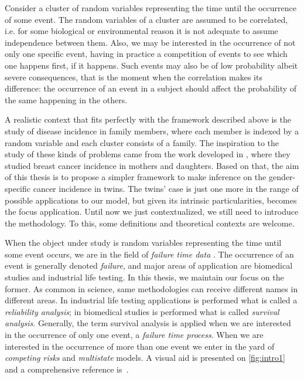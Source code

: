Consider a cluster of random variables representing the time until the
occurrence of some event. The random variables of a cluster are assumed
to be correlated, i.e. for some biological or environmental reason it is
not adequate to assume independence between them. Also, we may be
interested in the occurrence of not only one specific event, having in
practice a competition of events to see which one happens first, if it
happens. Such events may also be of low probability albeit severe
consequences, that is the moment when the correlation makes its
difference: the occurrence of an event in a subject should affect the
probability of the same happening in the others.

A realistic context that fits perfectly with the framework described
above is the study of disease incidence in family members, where each
member is indexed by a random variable and each cluster consists of a
family. The inspiration to the study of these kinds of problems came
from the work developed in , where they studied
breast cancer incidence in mothers and daughters. Based on that, the aim
of this thesis is to propose a simpler framework to make inference on
the gender-specific cancer incidence in twins. The twins' case is just
one more in the range of possible applications to our model, but given
its intrinsic particularities, becomes the focus application. Until now
we just contextualized, we still need to introduce the methodology. To
this, some definitions and theoretical contexts are welcome.

When the object under study is random variables representing the time
until some event occurs, we are in the field of \textit{failure time
  data} \cite{kalb&prentice}. The occurrence of an event is generally
denoted \textit{failure}, and major areas of application are biomedical
studies and industrial life testing. In this thesis, we maintain our
focus on the former. As common in science, same methodologies can
receive different names in different areas. In industrial life testing
applications is performed what is called a \textit{reliability
  analysis}; in biomedical studies is performed what is called
\textit{survival analysis}. Generally, the term survival analysis is
applied when we are interested in the occurrence of only one event, a
\textit{failure time process}. When we are interested in the occurrence
of more than one event we enter in the yard of \textit{competing risks}
and \textit{multistate} models. A visual aid is presented on
\autoref{fig:intro1} and a comprehensive reference
is~.


